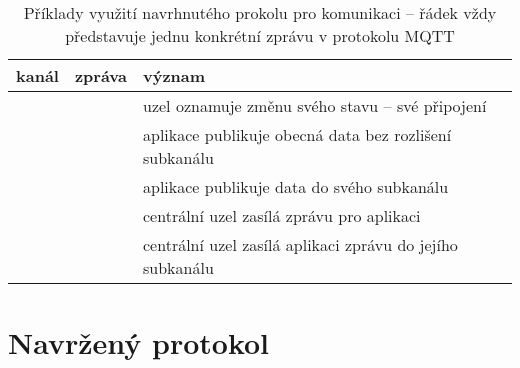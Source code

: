 \begin{table}
    \centering
    \caption{Příklady využití navrhnutého prokolu pro komunikaci -- řádek vždy představuje jednu konkrétní zprávu v
    protokolu MQTT}
    \begin{tabularx}{\textwidth}{s|l|s}
        \textbf{kanál} & \textbf{zpráva} & \textbf{význam} \\
        \hline
         &  & uzel  oznamuje změnu svého stavu -- své
        připojení \\

         &  & aplikace publikuje obecná data bez rozlišení
        subkanálu\\

         &  & aplikace publikuje data do svého
        subkanálu  \\

         &  & centrální uzel zasílá zprávu pro aplikaci
         \\

         &  & centrální uzel zasílá aplikaci
         zprávu do jejího subkanálu  \\


    \end{tabularx}
    \label{table:mqtt-subscribes}
\end{table}

\section{Navržený protokol}


